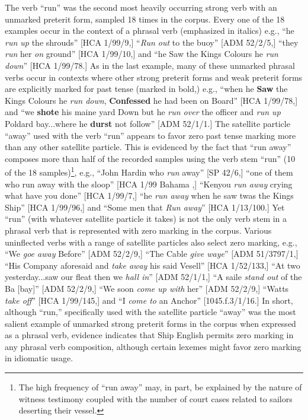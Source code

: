 The verb “run” was the second most heavily occurring strong verb with an unmarked preterit form, sampled 18 times in the corpus. Every one of the 18 examples occur in the context of a phrasal verb (emphasized in italics) e.g., “he \textit{run up} the shrouds” [HCA 1/99/9,] “\textit{Run out} to the buoy” [ADM 52/2/5,] “they \textit{run} her \textit{on} ground” [HCA 1/99/10,] and “he Saw the Kings Colours he \textit{run down}” [HCA 1/99/78.] As in the last example, many of these unmarked phrasal verbs occur in contexts where other strong preterit forms and weak preterit forms are explicitly marked for past tense (marked in bold,) e.g., “when he \textbf{Saw} the Kings Colours he \textit{run down}, \textbf{Confessed} he had been on Board” [HCA 1/99/78,] and “we \textbf{shote} his maine yard Down but he \textit{run over} the officer and \textit{run up} Poldard bay...where he \textbf{durst} not follow” [ADM 52/1/1.] The satellite particle “away” used with the verb “run” appears to favor zero past tense marking more than any other satellite particle. This is evidenced by the fact that “run away” composes more than half of the recorded samples using the verb stem “run” (10 of the 18 samples)\footnote{The high frequency of “run away” may, in part, be explained by the nature of witness testimony coupled with the number of court cases related to sailors deserting their vessel.}, e.g., “John Hardin who \textit{run} away” [SP 42/6,] “one of them who run away with the sloop” [HCA 1/99 Bahama \citealt{Islands1722},] “Kenyou \textit{run away} crying what have you done” [HCA 1/99/7,] “he \textit{run away} when he saw twas the Kings Ship” [HCA 1/99/96,] and “Some men that \textit{Run away}” [HCA 1/13/100.] Yet “run” (with whatever satellite particle it takes) is not the only verb stem in a phrasal verb that is represented with zero marking in the corpus. Various uninflected verbs with a range of satellite particles also select zero marking, e.g., “We \textit{goe away} Before” [ADM 52/2/9,] “The Cable \textit{give waye}” [ADM 51/3797/1,] “His Company aforesaid and \textit{take away} his said Vesell” [HCA 1/52/133,] “At two yesterday...saw our fleat then we \textit{hall in}” [ADM 52/1/1,] “A saile \textit{stand out} of the Ba [bay]” [ADM 52/2/9,] “We soon \textit{come up with} her” [ADM 52/2/9,] “Watts \textit{take off}” [HCA 1/99/145,] and “I \textit{come to} an Anchor” [1045.f.3/1/16.] In short, although “run,” specifically used with the satellite particle “away” was the most salient example of unmarked strong preterit forms in the corpus when expressed as a phrasal verb, evidence indicates that Ship English permits zero marking in any phrasal verb composition, although certain lexemes might favor zero marking in idiomatic usage. 

